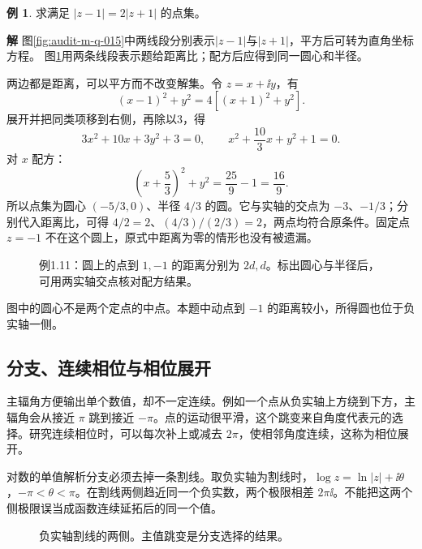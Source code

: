 \documentclass[11pt,openany,fontset=fandol]{ctexbook}
\theoremstyle{plain}\newtheorem{theorem}{定理}[chapter]\newtheorem{proposition}[theorem]{命题}
\theoremstyle{definition}\newtheorem{definition}{定义}[chapter]\newtheorem{example}{例}[chapter]
\theoremstyle{remark}\newtheorem*{remark}{说明}
\newcommand{\SolutionStart}{\par\nobreak\medskip\nobreak\noindent\textbf{解}\quad\ignorespaces}
\newenvironment{solution}{\SolutionStart}{\par\medskip}
\begin{document}
\begin{example}
求满足 $|z-1|=2|z+1|$ 的点集。
\end{example}

\begin{solution}
图\ref{fig:audit-m-q-015}中两线段分别表示$|z-1|$与$|z+1|$，平方后可转为直角坐标方程。
图\ref{fig:eg-1-11}用两条线段表示题给距离比；配方后应得到同一圆心和半径。

两边都是距离，可以平方而不改变解集。令 $z=x+\ii y$，有
\[
(x-1)^2+y^2=4[(x+1)^2+y^2].
\]
展开并把同类项移到右侧，再除以3，得
\[
3x^2+10x+3y^2+3=0,
\qquad x^2+\frac{10}3x+y^2+1=0.
\]
对 $x$ 配方：
\[
\left(x+\frac53\right)^2+y^2=\frac{25}9-1=\frac{16}9.
\]
所以点集为圆心 $(-5/3,0)$、半径 $4/3$ 的圆。它与实轴的交点为 $-3$、$-1/3$；分别代入距离比，可得 $4/2=2$、$(4/3)/(2/3)=2$，两点均符合原条件。固定点 $z=-1$ 不在这个圆上，原式中距离为零的情形也没有被遗漏。

\begin{figure}[H]\centering
{}
\caption{例1.11：圆上的点到 $1,-1$ 的距离分别为 $2d,d$。标出圆心与半径后，可用两实轴交点核对配方结果。}\label{fig:eg-1-11}
\end{figure}

图中的圆心不是两个定点的中点。本题中动点到 $-1$ 的距离较小，所得圆也位于负实轴一侧。
\end{solution}

\subsection{分支、连续相位与相位展开}
主辐角方便输出单个数值，却不一定连续。例如一个点从负实轴上方绕到下方，主辐角会从接近 $\pi$ 跳到接近 $-\pi$。点的运动很平滑，这个跳变来自角度代表元的选择。研究连续相位时，可以每次补上或减去 $2\pi$，使相邻角度连续，这称为相位展开。

对数的单值解析分支必须去掉一条割线。取负实轴为割线时，$\log z=\ln|z|+\ii\theta$，$-\pi<\theta<\pi$。在割线两侧趋近同一个负实数，两个极限相差 $2\pi\ii$。不能把这两个侧极限误当成函数连续延拓后的同一个值。
\begin{figure}[htbp]\centering
{}
\caption{负实轴割线的两侧。主值跳变是分支选择的结果。}
\label{fig:orig-012}
\end{figure}
\end{document}

